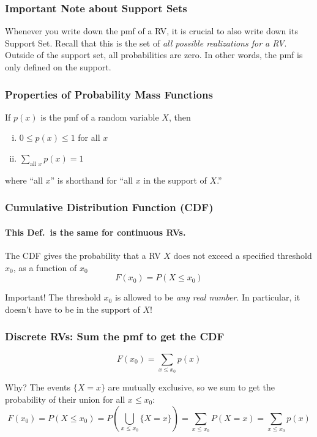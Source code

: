 \documentclass[handout]{beamer}
\begin{document}
\begin{frame}
\frametitle{Important Note about Support Sets}
Whenever you write down the pmf of a RV, it is \alert{crucial} to also write down its Support Set. Recall that this is the set of \alert{\emph{all possible realizations for a RV}}. Outside of the support set, all probabilities are zero. In other words, the pmf is \alert{only defined} on the support.

\end{frame}
\begin{frame}
\frametitle{Properties of Probability Mass Functions}

If $p(x)$ is the pmf of a random variable $X$, then
\begin{enumerate}[(i)]
	\item $0\leq p(x) \leq 1$ for all $x$ \vspace{1em}
	\item $\displaystyle \sum_{\mbox{all } x} p(x) = 1$
\end{enumerate}

\vspace{0.75em}
where ``all $x$'' is shorthand for ``all $x$ in the support of $X$.''

\end{frame}

\begin{frame}
\frametitle{Cumulative Distribution Function (CDF)}
\framesubtitle{This Def.\ is \alert{the same} for continuous RVs.}

The CDF gives the probability that a RV $X$ \alert{does not exceed} a specified threshold $x_0$, as a function of $x_0$
	$$F(x_0) = P(X \leq x_0)$$

\begin{alertblock}{Important!}
The threshold $x_0$ is allowed to be \emph{any real number}. In particular, it doesn't have to be in the support of $X$! 
\end{alertblock}

\end{frame}
\begin{frame}
\frametitle{Discrete RVs: Sum the pmf to get the CDF}
\begin{center}
	\alert{$$\boxed{F(x_0) = \sum_{x\leq x_0} p(x)}$$}
\end{center}

\small
 
\begin{block}{Why?}
The events $\{X = x\}$ are mutually exclusive, so we sum to get the probability of their union for all $x\leq x_0$:
	$$F(x_0) = P(X \leq x_0)=   P\left(\bigcup_{x\leq x_0}\{X = x\}\right) =   \sum_{x \leq x_0} P(X = x) =   \sum_{x \leq x_0} p(x)$$
\end{block}

\end{frame}
\end{document}
